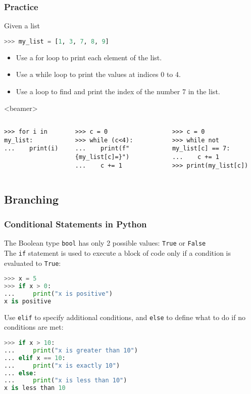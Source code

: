 \begin{frame}[fragile,label=practice_for]
  \frametitle{Practice}
  Given a list
  \begin{lstlisting}[language=Python,numbers=none]
>>> my_list = [1, 3, 7, 8, 9] 
  \end{lstlisting}
 
 \begin{itemize}
  \item Use a for loop to print each element of the list.\pause
  \item Use a while loop to print the values at indices 0 to 4.\pause
  \item Use a loop to find and print the index of the number 7 in the list.
 \end{itemize}
 \begin{onlyenv}<beamer>
  \begin{columns}[T]
      \begin{lstlisting}[]
>>> for i in my_list:
...    print(i)
      \end{lstlisting}
      \begin{lstlisting}[]
>>> c = 0
>>> while (c<4):
...    print(f"{my_list[c]=}")
...    c += 1
      \end{lstlisting}
      \begin{lstlisting}[]
>>> c = 0
>>> while not my_list[c] == 7:
...    c += 1
>>> print(my_list[c])
      \end{lstlisting}      
  \end{columns}
 \end{onlyenv}
\end{frame}

\subsection{Branching}
\begin{frame}[fragile]
  \frametitle{Conditional Statements in Python}
  The Boolean type \lstinline|bool| has only 2 possible values: \lstinline|True| or \lstinline|False| \\
  The \lstinline{if} statement is used to execute a block of code only if a condition is evaluated to \lstinline|True|:
  \begin{lstlisting}[language=Python, numbers=none, deletekeywords={is,not}]
>>> x = 5
>>> if x > 0:
...     print("x is positive")
x is positive
  \end{lstlisting}\pause
  Use \lstinline{elif} to specify additional conditions, and \lstinline{else} to define what to do if no conditions are met:
  \begin{lstlisting}[language=Python, numbers=none, deletekeywords={is,not}]
>>> if x > 10:
...     print("x is greater than 10")
... elif x == 10:
...     print("x is exactly 10")
... else:
...     print("x is less than 10")
x is less than 10
  \end{lstlisting}
\end{frame}

